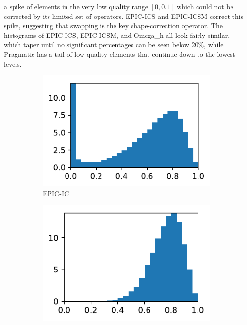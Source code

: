\documentclass[3p,times,procedia,number]{elsarticle}
\begin{document}
a spike of elements in the very low quality range $[0,0.1]$
which could not be corrected by its limited set of operators.
EPIC-ICS and EPIC-ICSM correct this spike, suggesting that
swapping is the key shape-correction operator.
The histograms of EPIC-ICS, EPIC-ICSM, and Omega\_h all look fairly
similar, which taper until no significant percentages can be
seen below 20\%, while Pragmatic has a tail of low-quality
elements that continue down to the lowest levels.
\begin{figure}
\begin{subfigure}{.16\textwidth}
\centering
\includegraphics[width=\textwidth]{epic-ic-cube-cylinder-linear-quality.pdf}
\caption{EPIC-IC}
\end{subfigure}
\begin{subfigure}{.16\textwidth}
\centering
\includegraphics[width=\textwidth]{epic-ics-cube-cylinder-linear-quality.pdf}

\end{subfigure}
\end{figure}
\end{document}
